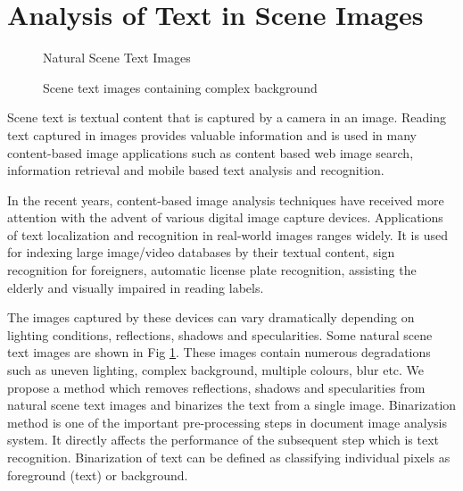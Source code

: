 \section{Analysis of Text in Scene Images}
\begin{figure}[t]
\centering
{}
\caption
{Natural Scene Text Images}
\label{fig:scenetext}
\end{figure}
\begin{figure}[t]
\centering
{}
\caption
{Scene text images containing complex background}
\label{fig:textchallenge}
\end{figure}

Scene text is textual content that is captured by a camera in an image.
Reading text captured in images provides valuable information and is
used in many content-based image
applications such as content based web image search,
information retrieval and mobile based text analysis
and recognition.

In the recent years, content-based image analysis techniques have received more attention with the 
advent of various digital image capture devices.
Applications of text localization
and recognition in real-world images ranges widely. It is used for indexing large image/video
databases by their textual content, sign recognition
for foreigners, automatic license plate recognition, assisting the elderly and visually
impaired in reading labels.

The images captured by these devices can vary dramatically depending on lighting conditions, reflections, 
shadows and specularities. Some natural scene text images are shown in Fig \ref{fig:scenetext}.
These images contain numerous degradations such as uneven lighting, complex background, multiple colours, blur etc.
We propose a method which removes reflections, shadows and specularities from natural scene text images and 
binarizes the text from a single image.
Binarization method is one of the important pre-processing steps in document image analysis system. 
It directly affects the performance of the subsequent step which is text recognition.
Binarization of text can be defined as classifying individual pixels as foreground (text) or background. 

